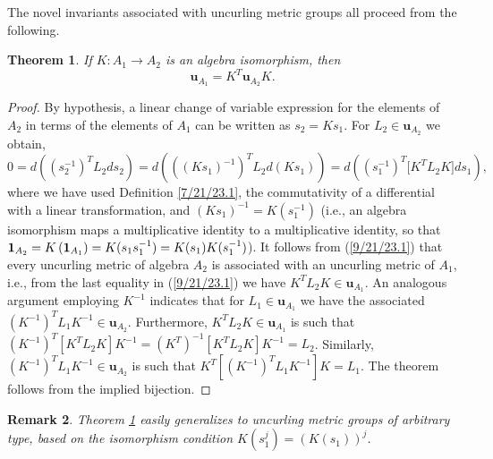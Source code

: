 \documentclass{amsart}
\numberwithin{equation}{section}
\newtheorem{theorem}{Theorem}
\newtheorem{remark}[theorem]{Remark}
\theoremstyle{definition}
\numberwithin{theorem}{section}
\begin{document}
The novel invariants associated with uncurling metric groups all proceed from the following.


\begin{theorem} \label{6/6/23.1} If $K:A_1\rightarrow A_2$ is an algebra isomorphism, then \begin{equation}\label{5/23/23.1} \mathbf{u}_{A_1} = K^T \mathbf{u}_{A_2} K. \end{equation} \end{theorem}

\begin{proof} By hypothesis, a linear change of variable expression for the elements of $A_2$ in terms of the elements of $A_1$ can be written as $s_2= Ks_1$. For $L_2\in \mathbf{u}_{A_2}$ we obtain, \begin{equation} 0 = d\left((s_2^{-1})^T L_2 ds_2\right) =  d\left(((Ks_1)^{-1})^T L_2 d(Ks_1)\right) = d\left((s_1^{-1})^T \big[K^T L_2K\big]ds_1\right), \label{9/21/23.1}  \end{equation} where we have used Definition \ref{7/21/23.1}, the commutativity of a differential with a linear transformation, and $(Ks_1)^{-1} = K(s_1^{-1})$ (i.e., an algebra isomorphism maps a multiplicative identity to a multiplicative identity, so that ${\bf 1}_{A_2} = K\left(\mathbf{1}_{A_1}\right) = K(s_1s_1^{-1}) = K(s_1)K(s_1^{-1})$).  It follows from (\ref{9/21/23.1}) that every uncurling metric  of algebra $A_2$ is associated with an uncurling metric of $A_1$, i.e., from the last equality in (\ref{9/21/23.1}) we have  $K^TL_2K\in\mathbf{u}_{A_1}$.  An analogous argument employing $K^{-1}$ indicates that for $L_1\in\mathbf{u}_{A_1}$ we have the associated $(K^{-1})^T L_1 K^{-1} \in \mathbf{u}_{A_2}$.  Furthermore, $K^T L_2K\in\mathbf{u}_{A_1}$ is such that $(K^{-1})^T [K^T L_2 K]K^{-1} = (K^T)^{-1} [K^T L_2 K]K^{-1} = L_2$.  Similarly, $(K^{-1})^T L_1K^{-1}\in\mathbf{u}_{A_2}$ is such that $K^T[(K^{-1})^T L_1K^{-1}] K = L_1$.  The theorem follows from the implied bijection. 
\end{proof}

\begin{remark} \label{9/18/23.1} {\rm Theorem \ref{6/6/23.1} easily generalizes to uncurling metric groups of arbitrary type, based on the isomorphism condition $K(s_1^j) = (K(s_1))^j$.   } \end{remark}
\end{document}
